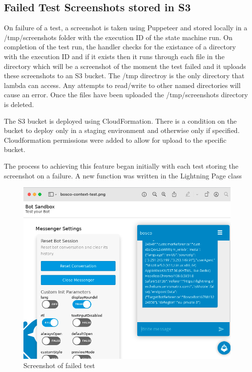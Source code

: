 \documentclass[12pt,a4paper,titlepage]{report}
\begin{document}
\subsection{Failed Test Screenshots stored in S3}
On failure of a test, a screenshot is taken using Puppeteer and stored locally in a /tmp/screenshots folder with the execution ID of the state 
machine run. On completion of the test run, the handler checks for the existance of a directory with the execution ID and if 
it exists then it runs through each file in the directory which will be a screenshot of the moment the test failed and it uploads 
these screenshots to an S3 bucket. The /tmp directroy is the only directory that lambda can access. Any attempts to read/write 
to other named directories will cause an error. Once the files have been uploaded the /tmp/screenshots directory is deleted.

The S3 bucket is deployed using  CloudFormation. There is a condition on the bucket to deploy only in a staging environment and 
otherwise only if specified. Cloudformation permissions were added to allow for upload to the specific bucket.

The process to achieving this feature began initially with each test storing the screenshot on a failure. A new function 
was written in the Lightning Page class
\begin{figure}[ht]
  \centering
  \includegraphics[width=\textwidth,height=\textheight,keepaspectratio]{./diagrams/screenshot.png}
  \caption{Screenshot of failed test}
 \end{figure}
\end{document}

